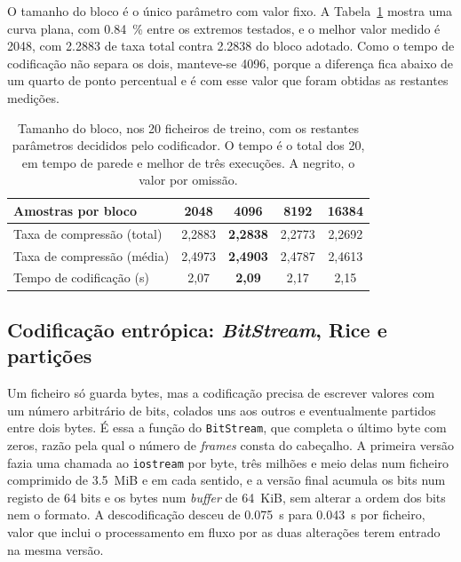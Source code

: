 \documentclass[a4paper,11pt]{article}
\newcommand{\prog}[1]{\texttt{#1}}
\begin{document}
O tamanho do bloco é o único parâmetro com valor fixo. A Tabela~\ref{tab:bloco}
mostra uma curva plana, com \SI{0,84}{\percent} entre os extremos testados, e o
melhor valor medido é \num{2048}, com \num{2,2883} de taxa total contra
\num{2,2838} do bloco adotado. Como o tempo de codificação não separa os dois,
manteve-se \num{4096}, porque a diferença fica abaixo de um quarto de ponto
percentual e é com esse valor que foram obtidas as restantes medições.

\begin{table}[htbp]
\centering
\caption{Tamanho do bloco, nos 20 ficheiros de treino, com os restantes
parâmetros decididos pelo codificador. O tempo é o total dos 20, em tempo de
parede e melhor de três execuções. A negrito, o valor por omissão.}
\label{tab:bloco}
\small
\begin{tabular}{lcccc}
\toprule
Amostras por bloco & \num{2048} & \textbf{\num{4096}} & \num{8192} & \num{16384} \\
\midrule
Taxa de compressão (total) & 2,2883 & \textbf{2,2838} & 2,2773 & 2,2692 \\
Taxa de compressão (média) & 2,4973 & \textbf{2,4903} & 2,4787 & 2,4613 \\
Tempo de codificação (s)   & 2,07 & \textbf{2,09} & 2,17 & 2,15 \\
\bottomrule
\end{tabular}
\end{table}


\subsection{Codificação entrópica: \emph{BitStream}, Rice e partições}
\label{sec:rice}
Um ficheiro só guarda bytes, mas a codificação precisa de escrever valores com
um número arbitrário de bits, colados uns aos outros e eventualmente partidos
entre dois bytes. É essa a função do \prog{BitStream}, que completa o último
byte com zeros, razão pela qual o número de \emph{frames} consta do cabeçalho. A
primeira versão fazia uma chamada ao \texttt{iostream} por byte, três milhões e
meio delas num ficheiro comprimido de \SI{3,5}{MiB} e em cada sentido, e a
versão final acumula os bits num registo de \num{64} bits e os bytes num
\emph{buffer} de \SI{64}{KiB}, sem alterar a ordem dos bits nem o formato. A
descodificação desceu de \SI{0,075}{\second} para \SI{0,043}{\second} por
ficheiro, valor que inclui o processamento em fluxo por as duas alterações terem
entrado na mesma versão.
\end{document}
